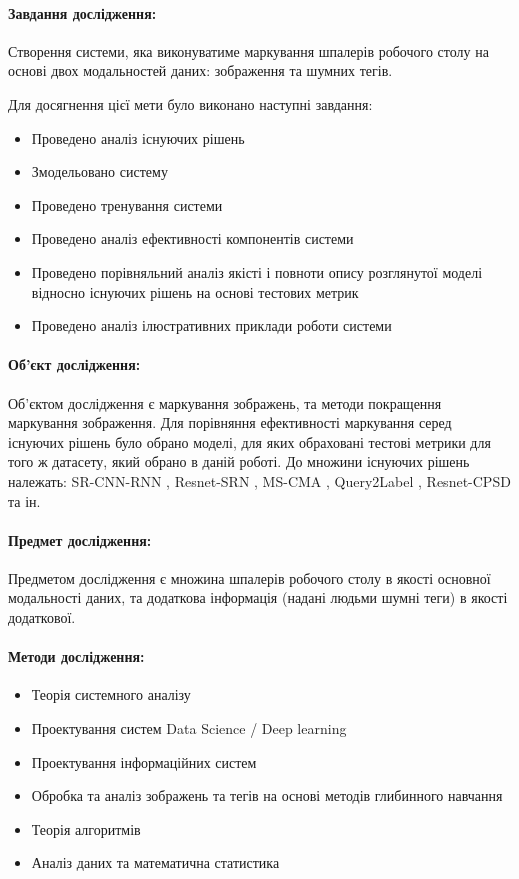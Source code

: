 \documentclass{udstu}
\begin{document}
\paragraph{\textbf{Завдання дослідження:}}
Створення системи, яка виконуватиме маркування шпалерів робочого столу на основі двох модальностей даних:
зображення та шумних тегів.

Для досягнення цієї мети було виконано наступні завдання:

\begin{itemize}
	\item Проведено аналіз існуючих рішень
	\item Змодельовано систему
	\item Проведено тренування системи
	\item Проведено аналіз ефективності компонентів системи
	\item Проведено порівняльний аналіз якісті і повноти опису розглянутої моделі
	відносно існуючих рішень на основі тестових метрик
	\item Проведено аналіз ілюстративних приклади роботи системи
\end{itemize}

\paragraph{\textbf{Об'єкт дослідження:}}
Об'єктом дослідження є маркування зображень, та методи покращення маркування зображення.
Для порівняння ефективності маркування серед існуючих рішень було обрано моделі,
для яких обраховані тестові метрики для того ж датасету, який обрано в даній роботі.
До множини існуючих рішень належать: SR-CNN-RNN \cite{sr-cnn-rnn}, Resnet-SRN \cite{srn},
MS-CMA \cite{cma}, Query2Label \cite{q2l}, Resnet-CPSD \cite{cpsd} та ін.

\paragraph{\textbf{Предмет дослідження:}}
Предметом дослідження є множина шпалерів робочого столу в якості основної модальності даних,
та додаткова інформація (надані людьми шумні теги) в якості додаткової.

\paragraph{\textbf{Методи дослідження:}}
\begin{itemize}[*]
	\item Теорія системного аналізу
	\item Проектування систем Data Science / Deep learning
	\item Проектування інформаційних систем
	\item Обробка та аналіз зображень та тегів на основі методів глибинного навчання
	\item Теорія алгоритмів
	\item Аналіз даних та математична статистика
\end{itemize}
\end{document}
